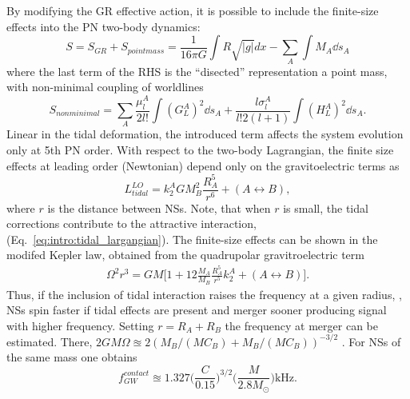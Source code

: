 By modifying the \ac{GR} effective action, it is possible to include the finite-size effects 
into the \ac{PN} two-body dynamics:
%
\begin{equation}
    S = S_{GR} + S_{pointmass} = \frac{1}{16\pi G}\int R\sqrt{|g|}dx - \sum_{A}\int M_A \dd s_A
\end{equation}
%
where the last term of the \ac{RHS} is the ``disected'' representation  a point mass, 
with non-minimal coupling of worldlines 
%
\begin{equation}
    S_{nonminimal} = \sum_{A}\frac{\mu_l^{A}}{2l!}\int (G_L^A)^2 \dd s_A + \frac{l \sigma_l^A}{l! 2(l+1)} \int(H_{L}^A)^2 \dd s_A.
\end{equation}
%
Linear in the tidal deformation, the introduced term affects the system evolution only at 5th 
\ac{PN} order. With respect to the two-body Lagrangian, the finite size effects at leading order 
(Newtonian) depend only on the gravitoelectric terms as 
%
\begin{equation}
    \label{eq:intro:tidal_largangian}
    L^{LO}_{tidal} = k_2^A G M_B^2\frac{R_A^5}{r^6} + (A\leftrightarrow B),
\end{equation}
%
where $r$ is the distance between \acp{NS}. 
%
Note, that when $r$ is small, the tidal corrections contribute to the attractive interaction,
(Eq.~\eqref{eq:intro:tidal_largangian}). 
%
The finite-size effects can be shown in the modifed Kepler law, obtained from the quadrupolar 
gravitroelectric term 
%
\begin{eqnarray}
    \Omega^2 r^3 = G M \Big[ 1 + 12 \frac{M_A}{M_B} \frac{R_A^5}{r^5} k_2^A + (A\leftrightarrow B) \Big].
\end{eqnarray}
%
Thus, if the inclusion of tidal interaction raises the frequency at a given radius, \ie, 
\acp{NS} spin faster if tidal effects are present and merger sooner producing signal with 
higher frequency. 
%
Setting $r=R_A+R_B$ the frequency at merger can be estimated. There, $2GM\Omega\approxeq2(M_B/(MC_B) + M_B/(MC_B))^{-3/2}$ \cite{29}. 
For \acp{NS} of the same mass one obtains 
%
\begin{equation}
    f_{GW}^{contact} \approxeq 1.327 \Big( \frac{C}{0.15} \Big)^{3/2} \Big( \frac{M}{2.8M_{\odot}} \Big) \text{kHz}.
\end{equation}

